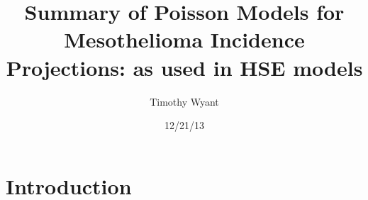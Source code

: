\documentclass[paper=letter,listof=leveldown,appendixprefix=true]{scrreprt}\usepackage{graphicx, color}
\begin{document}
                     








\title{ Summary of Poisson Models for Mesothelioma Incidence Projections:\n
as used in HSE models}
\author{Timothy Wyant}
\date{ 12/21/13}
\maketitle


\fancyhf{}                          %
\renewcommand{\headrulewidth}{0pt}  %
\fancyfoot[C]{\thepage}             %

\setcounter{page}{1}
\tableofcontents
\listoftables
\listoffigures

\chapter{Introduction}
\end{document}
